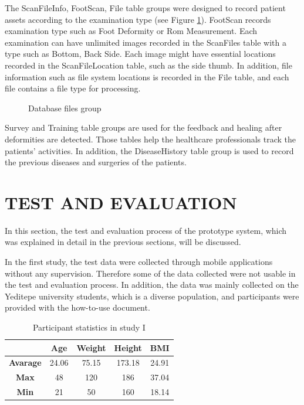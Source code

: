 The ScanFileInfo, FootScan, File table groups were designed to record patient assets according to the examination type (see Figure \ref{fig:DatabaseFiles}). FootScan records examination type such as Foot Deformity or Rom Measurement. Each examination can have unlimited images recorded in the ScanFiles table with a type such as Bottom, Back Side. Each image might have essential locations recorded in the ScanFileLocation table, such as the side thumb. In addition, file information such as file system locations is recorded in the File table, and each file contains a file type for processing.

\begin{figure}[htbp]
\centering
{}
\caption{Database files group}
\label{fig:DatabaseFiles}
\end{figure}

Survey and Training table groups are used for the feedback and healing after deformities are detected. Those tables help the healthcare professionals track the patients' activities. In addition, the DiseaseHistory table group is used to record the previous diseases and surgeries of the patients.

\section{TEST AND EVALUATION} \label{sec:StudyITestAndEvaluation}

In this section, the test and evaluation process of the prototype system, which was explained in detail in the previous sections, will be discussed.

In the first study, the test data were collected through mobile applications without any supervision. Therefore some of the data collected were not usable in the test and evaluation process. In addition, the data was mainly collected on the Yeditepe university students, which is a diverse population, and participants were provided with the how-to-use document.

\begin{table}[htbp]
\begin{center}
\caption{Participant statistics in study I}
\vspace{23pt}
      \begin{tabular}{|c|c|c|c|c|} \hline
          & \textbf{Age} & \textbf{Weight} & \textbf{Height} & \textbf{BMI} \\ \hline
        \textbf{Avarage} & 24.06 & 75.15 & 173.18 & 24.91 \\ \hline
        \textbf{Max} & 48 & 120 & 186 & 37.04 \\ \hline
        \textbf{Min} & 21 & 50 & 160 & 18.14 \\ \hline
    \end{tabular}
\label{tab:StudyIParticipantStatistics}
\end{center}
\end{table}

